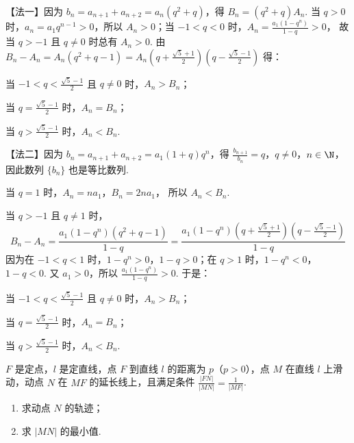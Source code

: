 \documentclass[UTF8,a4paper,oneside,11pt]{ctexbook}
\begin{document}
\begin{solution}
【法一】因为 \(b_n=a_{n+1}+a_{n+2}=a_n(q^2+q)\)，得 \(B_n=(q^2+q)A_n\).
当 \(q>0\) 时，\(a_n=a_1q^{n-1}>0\)，所以 \(A_n>0\)；当 \(-1<q<0\) 时，\(A_n=\frac{a_1(1-q^n)}{1-q}>0\)，
故当 \(q>-1\) 且 \(q\neq 0\) 时总有 \(A_n>0\). 由 \(B_n-A_n=A_n(q^2+q-1)=A_n\left( q+\frac{\sqrt{5}+1}{2} \right)\left( q-\frac{\sqrt{5}-1}{2} \right)\) 得：

当 \(-1<q<\frac{\sqrt{5}-1}{2}\) 且 \(q\neq 0\) 时，\(A_n>B_n\)；

当 \(q=\frac{\sqrt{5}-1}{2}\) 时，\(A_n=B_n\)；

当 \(q>\frac{\sqrt{5}-1}{2}\) 时，\(A_n<B_n\).

【法二】因为 \(b_n=a_{n+1}+a_{n+2}=a_1(1+q)q^n\)，得 \(\frac{b_{n+1}}{b_n}=q\)，\(q\neq 0\)，\(n\in \N\)，
因此数列 \(\{b_n\}\) 也是等比数列.

当 \(q=1\) 时，\(A_n=na_1\)，\(B_n=2na_1\)，
所以 \(A_n<B_n\).

当 \(q>-1\) 且 \(q\neq 1\) 时，
\[
B_n-A_n=\frac{a_1(1-q^n)(q^2+q-1)}{1-q}
=\frac{a_1(1-q^n)\left( q+\frac{\sqrt{5}+1}{2} \right)\left( q-\frac{\sqrt{5}-1}{2} \right)}{1-q}
\]
因为在 \(-1<q<1\) 时，\(1-q^n>0\)，\(1-q>0\)；在 \(q>1\) 时，\(1-q^n<0\)，\(1-q<0\). 又 \(a_1>0\)，所以 \(\frac{a_1(1-q^n)}{1-q}>0\). 于是：

当 \(-1<q<\frac{\sqrt{5}-1}{2}\) 且 \(q\neq 0\) 时，\(A_n>B_n\)；

当 \(q=\frac{\sqrt{5}-1}{2}\) 时，\(A_n=B_n\)；

当 \(q>\frac{\sqrt{5}-1}{2}\) 时，\(A_n<B_n\).
\end{solution}

\begin{problem}
\(F\) 是定点，\(l\) 是定直线，点 \(F\) 到直线 \(l\) 的距离为 \(p\)（\(p>0\)），点 \(M\) 在直线 \(l\) 上滑动，动点 \(N\) 在 \(MF\) 的延长线上，且满足条件 \(\frac{|FN|}{|MN|}=\frac{1}{|MF|}\).
\begin{enumerate}
\item 求动点 \(N\) 的轨迹；
\item 求 \(|MN|\) 的最小值.
\end{enumerate}
\end{problem}
\end{document}
